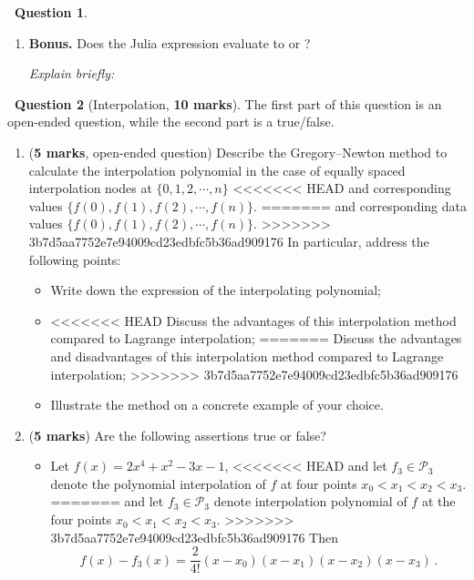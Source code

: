 \documentclass[10pt]{article}
\theoremstyle{definition}
\newtheorem{question}{{\normalfont \faGears}~Question}
\renewcommand{\mymarks}[1]{\textbf{#1 marks}}
\begin{document}
\begin{question}
\begin{enumerate}
            \textit{Explain briefly:}
            \vspace{1cm}

        \item
            \textbf{Bonus.}
            Does the Julia expression  evaluate to  or ?

            \textit{Explain briefly:}
            \vspace{1cm}
    \end{enumerate}
\end{question}

\newpage
\begin{question}
    [Interpolation, \mymarks{10}]
    The first part of this question is an open-ended question,
    while the second part is a true/false.

    \begin{enumerate}
        \item (\mymarks{5}, open-ended question)
            Describe the Gregory--Newton method to calculate the interpolation polynomial in the case of equally spaced interpolation nodes at $\{0, 1, 2, \cdots, n\}$ 
<<<<<<< HEAD
            and corresponding values $\{f(0), f(1), f(2), \cdots, f(n)\}$.
=======
            and corresponding data values $\{f(0), f(1), f(2), \cdots, f(n)\}$.
>>>>>>> 3b7d5aa7752e7e94009cd23edbfc5b36ad909176
            In particular, address the following points:
            \begin{itemize}
                \item 
                    Write down the expression of the interpolating polynomial;

                \item
<<<<<<< HEAD
                    Discuss the advantages of this interpolation method compared to Lagrange interpolation;
=======
                    Discuss the advantages and disadvantages of this interpolation method compared to Lagrange interpolation;
>>>>>>> 3b7d5aa7752e7e94009cd23edbfc5b36ad909176

                \item
                    Illustrate the method on a concrete example of your choice.
            \end{itemize}

    \newpage
    \item
        (\mymarks{5}) Are the following assertions true or false?
        \begin{itemize}
            \item 
                Let $f(x) = 2x^4 + x^2 - 3x - 1$,
<<<<<<< HEAD
                and let $f_3 \in \mathcal P_3$ denote the polynomial interpolation of $f$ at four points $x_0 < x_1 < x_2 < x_3$.
=======
                and let $f_3 \in \mathcal P_3$ denote interpolation polynomial of $f$ at the four points $x_0 < x_1 < x_2 < x_3$.
>>>>>>> 3b7d5aa7752e7e94009cd23edbfc5b36ad909176
                Then
                \[
                    f(x) - f_3(x) = \frac{2}{4!} (x - x_0)(x - x_1)(x - x_2)(x - x_3) \, .
                \]


\end{itemize}
\end{enumerate}
\end{question}
\end{document}
